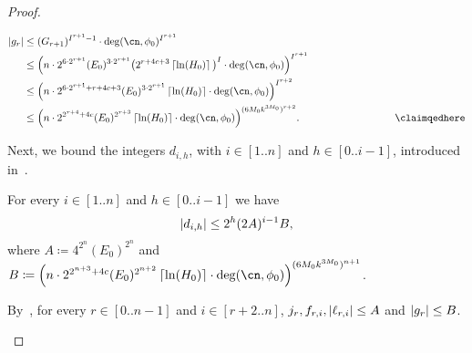 \begin{proof}
\begin{claimproof}
\begin{align*}
      \abs{g_r} 
        &\leq (G_{r+1})^{I^{r+1}-1} \cdot \deg(\cn,\phi_0)^{I^{r+1}}\\
        &\leq \Big(n \cdot 2^{6 \cdot 2^{r+1}}(E_0)^{3 \cdot 2^{r+1}} \big(2^{r+4c+3} \ceil{\ln(H_0)}\big)^{I} \cdot \deg(\cn,\phi_0) \Big)^{I^{r+1}}\\
        &\leq \Big(n \cdot 2^{6 \cdot 2^{r+1}+r+4c+3}(E_0)^{3 \cdot 2^{r+1}} \ceil{\ln(H_0)} \cdot \deg(\cn,\phi_0) \Big)^{I^{r+2}}\\
        &\leq \Big(n \cdot 2^{2^{r+4}+4c}(E_0)^{2^{r+3}} \ceil{\ln(H_0)} \cdot \deg(\cn,\phi_0) \Big)^{(6M_0k^{3M_0})^{r+2}}.
        &\hspace{2.6cm}\text{\claimqedhere}
    \end{align*}
  \end{claimproof}
  Next, we bound the integers $d_{i,h}$, with $i \in [1..n]$ and $h \in [0..i-1]$, 
  introduced in~.%
  \begin{claim}
    \label{claim:bounds-on-dih}
    For every $i \in [1..n]$ and $h \in [0..i-1]$ we have 
    \[ 
      \left|d_{i,h}\right| \leq 2^{h} (2A)^{i-1}B,
    \]
    where $A \coloneqq 4^{2^n} (E_0)^{2^n}$ and $B \coloneqq \Big(n \cdot
    2^{2^{n+3}+4c}(E_0)^{2^{n+2}} \ceil{\ln(H_0)} \cdot \deg(\cn,\phi_0)
    \Big)^{(6M_0k^{3M_0})^{n+1}}$.
  \end{claim}
  \begin{claimproof}
    By~, for every $r \in [0..n-1]$ and $i \in
    [r+2..n]$, $j_r,f_{r,i},\left|\ell_{r,i}\right| \leq A$ and $\left|g_r\right| \leq
    B$. 
    

\end{claimproof}
\end{proof}
